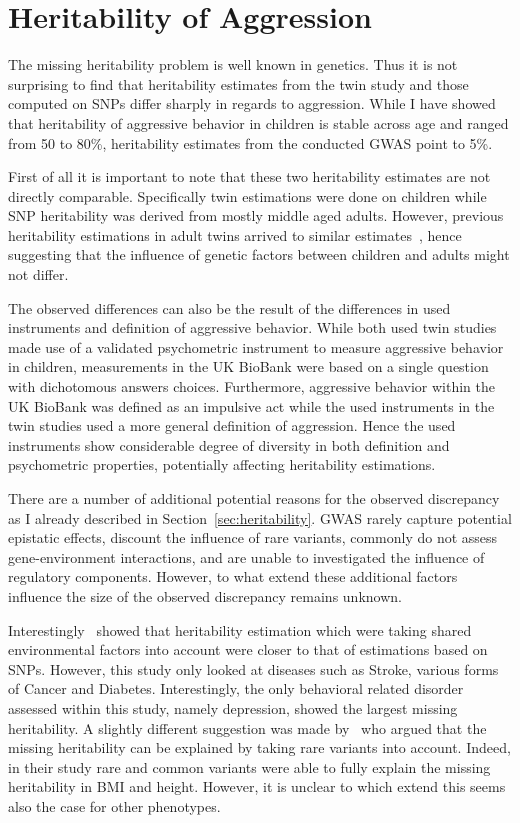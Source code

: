 \section{Heritability of Aggression}
\label{sec:heritability_of_aggression}

The missing heritability problem is well known in genetics.
Thus it is not surprising to find that heritability estimates from the twin study and those computed on SNPs differ sharply in regards to aggression.
While I have showed that heritability of aggressive behavior in children is stable across age and ranged from 50 to 80\%, heritability estimates from the conducted GWAS point to 5\%. 

First of all it is important to note that these two heritability estimates are not directly comparable.
Specifically twin estimations were done on children while SNP heritability was derived from mostly middle aged adults.
However, previous heritability estimations in adult twins arrived to similar estimates~\cite{Miles1997a}, hence suggesting that the influence of genetic factors between children and adults might not differ.

The observed differences can also be the result of the differences in used instruments and definition of aggressive behavior.
While both used twin studies made use of a validated psychometric instrument to measure aggressive behavior in children, measurements in the UK BioBank were based on a single question with dichotomous answers choices.
Furthermore, aggressive behavior within the UK BioBank was defined as an impulsive act while the used instruments in the twin studies used a more general definition of aggression.
Hence the used instruments show considerable degree of diversity in both definition and psychometric properties, potentially affecting heritability estimations.

There are a number of additional potential reasons for the observed discrepancy as I already described in Section~\ref{sec:heritability}.
GWAS rarely capture potential epistatic effects, discount the influence of rare variants, commonly do not assess gene-environment interactions, and are unable to investigated the influence of regulatory components. 
However, to what extend these additional factors influence the size of the observed discrepancy remains unknown.

Interestingly~\citet{Munoz2016a} showed that heritability estimation which were taking shared environmental factors into account were closer to that of estimations based on SNPs.
However, this study only looked at diseases such as Stroke, various forms of Cancer and Diabetes.
Interestingly, the only behavioral related disorder assessed within this study, namely depression, showed the largest missing heritability.
A slightly different suggestion was made by~\citet{Yang2015} who argued that the missing heritability can be explained by taking rare variants into account.
Indeed, in their study rare and common variants were able to fully explain the missing heritability in BMI and height.
However, it is unclear to which extend this seems also the case for other phenotypes.

